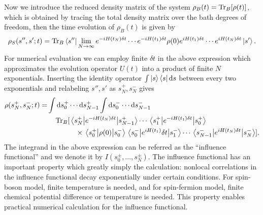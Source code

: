 \documentclass[11pt]{book}
\begin{document}
Now we introduce the reduced density matrix of the system
\(\rho_B(t)=\Tr_B[\rho(t)]\), which is obtained by tracing the total
density matrix over the bath degrees of freedom, then the time
evolution of \(\rho_B(t)\) is given by 
\begin{equation}
\rho_S(s'',s';t)=\Tr_B\bra{s''}
\lim_{N\to\infty}e^{-iH(t_N)\delta t}\cdots e^{-iH(t_1)\delta t}
\rho(0)e^{iH(t_1)\delta t}\cdots e^{iH(t_N)\delta t}\ket{s'}.
\end{equation}
For numerical evaluation we can employ finite \(\delta t\) in the above
expression which approximates the evolution operator \(U(t)\) into a
product of finite \(N\) exponentials. Inserting the identity operator
\(\int\ket{s}\bra{s}\dd{s}\) between every two exponentials and
relabeling \(s'',s'\) as \(s_N^+,s_N^-\) gives
\begin{equation}
\begin{split}
\rho(s_N^+,s_N^-;t)=&\int\dd{s}_0^+\cdots\dd{s_{N-1}^+}\int\dd{s_0^-}\cdots\dd{s_{N-1}^-}\\
&\quad\Tr_B[\mel{s_N^+}{e^{-iH(t_N)\delta t}}{s_{N-1}^+}\cdots
\mel{s_1^+}{e^{-iH(t_1)\delta t}}{s_0^+}\\
&\qquad\qquad\times\mel{s_0^+}{\rho(0)}{s_0^-}
\mel{s_0^-}{e^{iH(t_1)}\delta t}{s_1^-}\cdots
\mel{s_{N-1}^-}{e^{iH(t_N)\delta t}}{s_N^-}].
\end{split}
\end{equation}
The integrand in the above expression can be referred as the
``influence functional'' and we denote it by
\(I(s_0^{\pm},\ldots,s_N^{\pm})\). The influence functional has an
important property which greatly simply the calculation: nonlocal
correlations in the influence functional decay exponentially under
certain conditions. For spin-boson model, finite temperature is
needed, and for spin-fermion model, finite chemical potential
difference or temperature is needed. This property enables practical
numerical calculation for the influence functional.
\end{document}
